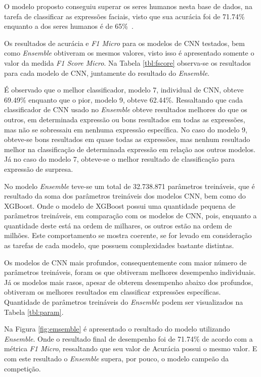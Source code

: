O modelo proposto conseguiu superar os seres humanos nesta base de dados, na tarefa de classificar as expressões faciais, visto que sua acurácia foi de 71.74\%\, enquanto a dos seres humanos é de 65\%\ \cite{goodfellow2013challenges}.

Os resultados de acurácia e \emph{F1 Micro} para os modelos de CNN testados, bem como \emph{Ensemble} obtiveram os mesmos valores, visto isso é apresentado somente o valor da medida \emph{F1 Score Micro}. Na Tabela \ref{tbl:fscore} observa-se os resultados para cada modelo de CNN, juntamente do resultado do \emph{Ensemble}.



É observado que o melhor classificador, modelo 7, individual de CNN, obteve 69.49\% enquanto que o pior, modelo 9, obteve 62.44\%. Ressaltando que cada classificador de CNN usado no \emph{Ensemble} obteve resultados melhores do que os outros, em determinada expressão ou bons resultados em todas as expressões, mas não se sobressaiu em nenhuma expressão específica. No caso do modelo 9, obteve-se bons resultados em quase todas as expressões, mas nenhum resultado melhor na classificação de determinada expressão em relação aos outros modelos. Já no caso do modelo 7, obteve-se o melhor resultado de classificação para expressão de surpresa.

No modelo \textit{Ensemble} teve-se um total de 32.738.871 parâmetros treináveis, que é resultado da soma dos parâmetros treináveis dos modelos CNN, bem como do XGBoost. Onde o modelo de XGBoost possui uma quantidade pequena de parâmetros treináveis, em comparação com os modelos de CNN, pois, enquanto a quantidade deste está na ordem de milhares, os outros estão na ordem de milhões. Este comportamento se mostra coerente, se for levado em consideração as tarefas de cada modelo, que possuem complexidades bastante distintas.



Os modelos de CNN mais profundos, consequentemente com maior número de parâmetros treináveis, foram os que obtiveram melhores desempenho individuais. Já os modelos mais rasos, apesar de obterem desempenho abaixo dos profundos, obtiveram os melhores resultados em classificar expressões específicas. Quantidade de parâmetros treináveis do \textit{Ensemble} podem ser visualizados na Tabela \ref{tbl:param}.

Na Figura \ref{fig:emsemble} é apresentado o resultado do modelo utilizando \emph{Ensemble}. Onde o resultado final de desempenho foi de 71.74\% de acordo com a métrica \emph{F1 Micro}, ressaltando que seu valor de Acurácia possui o mesmo valor. E com este resultado o \emph{Ensemble} supera, por pouco, o modelo campeão da competição.

